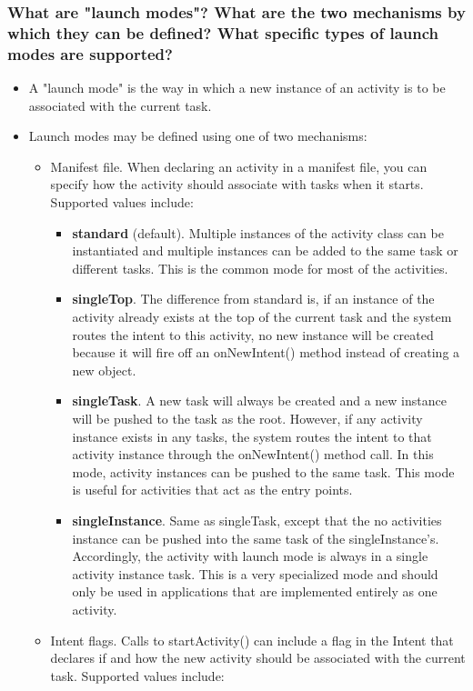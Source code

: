 \documentclass[9pt, b5paper]{article}
\begin{document}
\subsubsection{What are "launch modes"? What are the two mechanisms by which they can be defined? What specific types of launch modes are supported?}
\label{sec-1-2-17}
\begin{itemize}
\item A "launch mode" is the way in which a new instance of an activity is to be associated with the current task.
\item Launch modes may be defined using one of two mechanisms:
\begin{itemize}
\item Manifest file. When declaring an activity in a manifest file, you can specify how the activity should associate with tasks when it starts. Supported values include:
\begin{itemize}
\item \textbf{standard} (default). Multiple instances of the activity class can be instantiated and multiple instances can be added to the same task or different tasks. This is the common mode for most of the activities.
\item \textbf{singleTop}. The difference from standard is, if an instance of the activity already exists at the top of the current task and the system routes the intent to this activity, no new instance will be created because it will fire off an onNewIntent() method instead of creating a new object.
\item \textbf{singleTask}. A new task will always be created and a new instance will be pushed to the task as the root. However, if any activity instance exists in any tasks, the system routes the intent to that activity instance through the onNewIntent() method call. In this mode, activity instances can be pushed to the same task. This mode is useful for activities that act as the entry points.
\item \textbf{singleInstance}. Same as singleTask, except that the no activities instance can be pushed into the same task of the singleInstance's. Accordingly, the activity with launch mode is always in a single activity instance task. This is a very specialized mode and should only be used in applications that are implemented entirely as one activity.
\end{itemize}
\item Intent flags. Calls to startActivity() can include a flag in the Intent that declares if and how the new activity should be associated with the current task. Supported values include:

\end{itemize}
\end{itemize}
\end{document}
